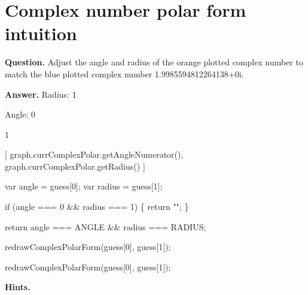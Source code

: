 \documentclass{article}
\begin{document}
\section*{Complex number polar form intuition}
\textbf{Question.} Adjust the angle and radius of the orange plotted complex number
                    to match the blue plotted complex number 1.9985594812264138+0i.

\textbf{Answer.} Radius: 1
                            
                                
                                
                            
                        
                        
                            Angle: 0
                            
                                
                                
                            
                        
                        1
                    
                    [
                        graph.currComplexPolar.getAngleNumerator(),
                        graph.currComplexPolar.getRadius()
                    ]
                    
                        var angle = guess[0];
                        var radius = guess[1];

                        if (angle === 0 \&\& radius === 1) \{
                            return "";
                        \}

                        return angle === ANGLE \&\& radius === RADIUS;
                    
                    
                        redrawComplexPolarForm(guess[0], guess[1]);
                    
                    
                        redrawComplexPolarForm(guess[0], guess[1]);

\textbf{Hints.}
\begin{itemize}

\end{itemize}
\end{document}
